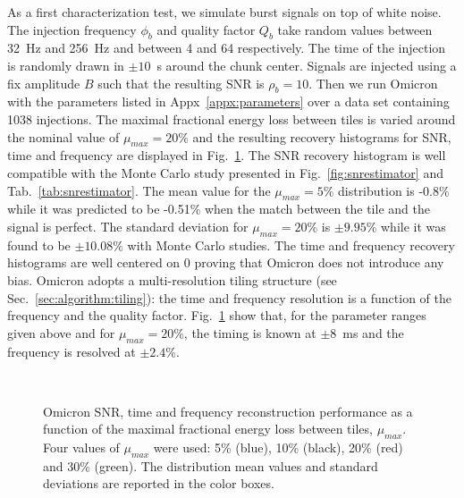 As a first characterization test, we simulate burst signals on top of white noise. The injection frequency $\phi_b$ and quality factor $Q_b$ take random values between 32~Hz and 256~Hz and between 4 and 64 respectively. The time of the injection is randomly drawn in $\pm10$~s around the chunk center. Signals are injected using a fix amplitude $B$ such that the resulting SNR is $\rho_b=10$. Then we run Omicron with the parameters listed in Appx~\ref{appx:parameters} over a data set containing 1038 injections. The maximal fractional energy loss between tiles is varied around the nominal value of $\mu_{max}=20\%$ and the resulting recovery histograms for SNR, time and frequency are displayed in Fig.~\ref{fig:char_mismatch}. The SNR recovery histogram is well compatible with the Monte Carlo study presented in Fig.~\ref{fig:snrestimator} and Tab.~\ref{tab:snrestimator}. The mean value for the $\mu_{max}=5\%$ distribution is -0.8\% while it was predicted to be -0.51\% when the match between the tile and the signal is perfect. The standard deviation for $\mu_{max}=20\%$ is $\pm9.95\%$ while it was found to be $\pm10.08\%$ with Monte Carlo studies. The time and frequency recovery histograms are well centered on 0 proving that Omicron does not introduce any bias. Omicron adopts a multi-resolution tiling structure (see Sec.~\ref{sec:algorithm:tiling}): the time and frequency resolution is a function of the frequency and the quality factor. Fig.~\ref{fig:char_mismatch} show that, for the parameter ranges given above and for $\mu_{max}=20\%$, the timing is known at $\pm8$~ms and the frequency is resolved at $\pm2.4\%$. 
\begin{figure}
  \center
   \\
  \caption{Omicron SNR, time and frequency reconstruction performance as a function of the maximal fractional energy loss between tiles, $\mu_{max}$. Four values of $\mu_{max}$ were used: 5\% (blue), 10\% (black), 20\% (red) and 30\% (green). The distribution mean values and standard deviations are reported in the color boxes.}
  \label{fig:char_mismatch}
\end{figure}

